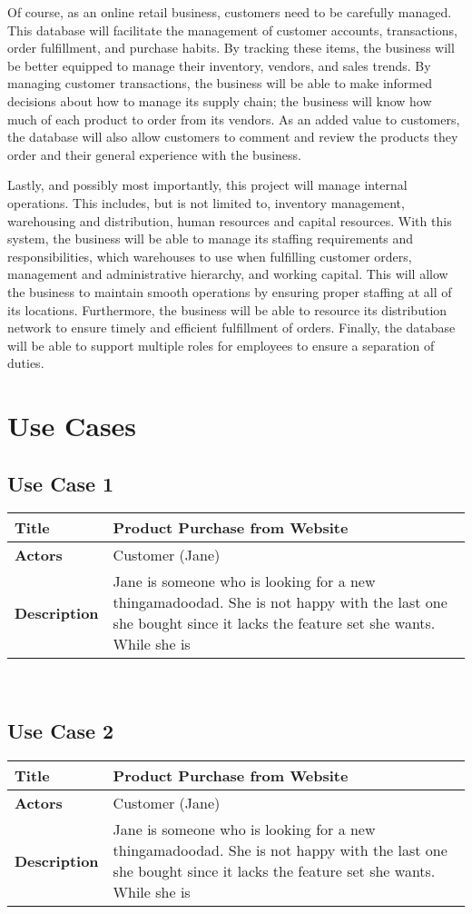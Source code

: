 \documentclass{article}
\begin{document}
Of course, as an online retail business, customers need to be carefully managed.  This database will facilitate the management of customer accounts, transactions, order fulfillment, and purchase habits.  By tracking these items, the business will be better equipped to manage their inventory, vendors, and sales trends.  By managing customer transactions, the business will be able to make informed decisions about how to manage its supply chain; the business will know how much of each product to order from its vendors.  As an added value to customers, the database will also allow customers to comment and review the products they order and their general experience with the business.

Lastly, and possibly most importantly, this project will manage internal operations.  This includes, but is not limited to, inventory management, warehousing and distribution, human resources and capital resources.  With this system, the business will be able to manage its staffing requirements and responsibilities, which warehouses to use when fulfilling customer orders, management and administrative hierarchy, and working capital.  This will allow the business to maintain smooth operations by ensuring proper staffing at all of its locations.  Furthermore, the business will be able to resource its distribution network to ensure timely and efficient fulfillment of orders.  Finally, the database will be able to support multiple roles for employees to ensure a separation of duties.

\pagebreak
\section{Use Cases}
\subsection{Use Case 1}
\begin{tabular}{ | l | l | }
\hline
\textbf{Title} & Product Purchase from Website\\
\hline
\textbf{Actors} &	Customer (Jane)	\\
\hline
\textbf{Description} & Jane is someone who is looking for a new thingamadoodad.  She is not happy with the last one she bought since it lacks the feature set she wants.  While she is\\
\hline
\end{tabular}
\hfill\\

\subsection{Use Case 2}
\begin{tabular}{ | l | l | }
\hline
\textbf{Title} & Product Purchase from Website\\
\hline
\textbf{Actors} &	Customer (Jane)	\\
\hline
\textbf{Description} & Jane is someone who is looking for a new thingamadoodad.  She is not happy with the last one she bought since it lacks the feature set she wants.  While she is\\
\hline
\end{tabular}
\hfill\\
\end{document}
